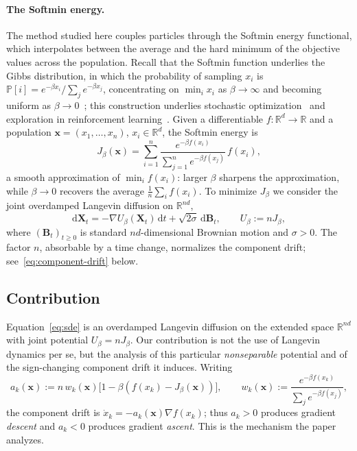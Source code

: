\documentclass{article}
\newcommand{\dd}{\mathrm d}
\theoremstyle{plain}
\theoremstyle{definition}
\theoremstyle{remark}
\newcommand{\R}{\mathbb{R}}
\newcommand{\xx}{\mathbf{x}}
\newcommand{\XX}{\mathbf{X}}
\newcommand{\BB}{\mathbf{B}}
\begin{document}
\paragraph{The Softmin energy.}
The method studied here couples particles through the Softmin energy functional, which interpolates between the average and the hard minimum of the objective values across the population. Recall that the Softmin function underlies the Gibbs distribution, in which the probability of sampling \(x_i\) is \(\mathbb P[i]=e^{-\beta x_i}/\sum_j e^{-\beta x_j}\), concentrating on \(\min_i x_i\) as \(\beta\to\infty\) and becoming uniform as \(\beta\to0\)~\cite{bertsekas1997nonlinear}; this construction underlies stochastic optimization~\cite{ackley1985boltzmann,srivastava2012multimodal,gelfand1990sampling,gelfand2000gibbs} and exploration in reinforcement learning~\cite{pan2019reinforcement,haarnoja2017reinforcement}. Given a differentiable \(f:\R^d\to\R\) and a population \(\xx=(x_1,\dots,x_n)\), \(x_i\in\R^d\), the Softmin energy is
\begin{equation}
    J_\beta(\xx)=\sum_{i=1}^n \frac{e^{-\beta f(x_i)}}{\sum_{j=1}^n e^{-\beta f(x_j)}}\,f(x_i),
    \label{eq:softmin-energy}
\end{equation}
a smooth approximation of \(\min_i f(x_i)\): larger \(\beta\) sharpens the approximation, while \(\beta\to0\) recovers the average \(\frac1n\sum_i f(x_i)\). To minimize \(J_\beta\) we consider the joint overdamped Langevin diffusion on \(\R^{nd}\),
\begin{equation}\label{eq:sde}
    \dd\XX_t = -\nabla U_\beta(\XX_t)\,\dd t+\sqrt{2\sigma}\,\dd\BB_t, \qquad U_\beta:=nJ_\beta,
\end{equation}
where \((\BB_t)_{t\ge0}\) is standard \(nd\)-dimensional Brownian motion and \(\sigma>0\). The factor \(n\), absorbable by a time change, normalizes the component drift; see~\eqref{eq:component-drift} below.

\subsection{Contribution}
\label{sec:contribution}

Equation~\eqref{eq:sde} is an overdamped Langevin diffusion on the extended space \(\R^{nd}\) with joint potential \(U_\beta=nJ_\beta\). Our contribution is not the use of Langevin dynamics per se, but the analysis of this particular \emph{nonseparable} potential and of the sign-changing component drift it induces. Writing
\[
    a_k(\xx):=n\,w_k(\xx)\bigl[1-\beta(f(x_k)-J_\beta(\xx))\bigr],
    \qquad
    w_k(\xx):=\frac{e^{-\beta f(x_k)}}{\sum_j e^{-\beta f(x_j)}},
\]
the component drift is \(\dot x_k=-a_k(\xx)\nabla f(x_k)\); thus \(a_k>0\) produces gradient \emph{descent} and \(a_k<0\) produces gradient \emph{ascent}. This is the mechanism the paper analyzes.
\end{document}
